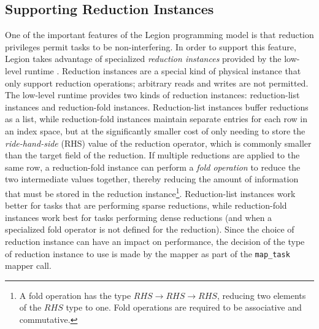 \subsection{Supporting Reduction Instances}
\label{subsec:physreductions}
One of the important features of the Legion programming
model is that reduction privileges permit tasks to 
be non-interfering. In order to support this feature, 
Legion takes advantage of specialized {\em reduction
instances} provided by the low-level runtime \cite{Realm14}.
Reduction instances are a special kind of physical 
instance that only support reduction operations; 
arbitrary reads and writes are not permitted. The low-level
runtime provides two kinds of reduction instances:
reduction-list instances and reduction-fold instances.
Reduction-list instances buffer reductions as a
list, while reduction-fold instances maintain
separate entries for each row in an index space, but
at the significantly smaller cost of only needing
to store the {\em ride-hand-side} (RHS) value
of the reduction operator, which is commonly smaller
than the target field of the reduction. If multiple
reductions are applied to the same row, a
reduction-fold instance can perform a {\em fold operation}
to reduce the two intermediate values together, thereby
reducing the amount of information that must be stored
in the reduction instance\footnote{A fold operation 
has the type $RHS \rightarrow RHS \rightarrow RHS$, reducing
two elements of the $RHS$ type to one. Fold operations 
are required to be associative and commutative.}.
Reduction-list instances work better for tasks 
that are performing sparse reductions, while reduction-fold
instances work best for tasks performing dense reductions
(and when a specialized fold operator is not defined for
the reduction). Since the choice of reduction instance
can have an impact on performance, the decision of the
type of reduction instance to use is made by the
mapper as part of the {\tt map\_task} mapper call.

